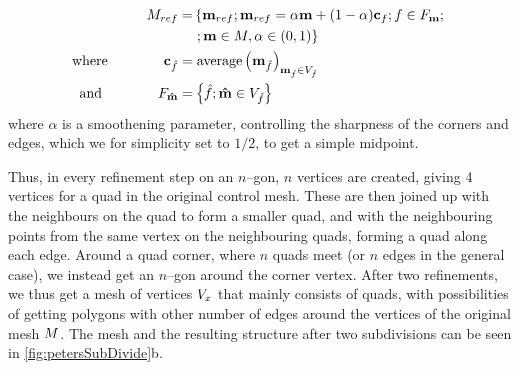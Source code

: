 \begin{align}
\petersControlMeshRef =& \left\lbrace \petersControlMeshVec_{ref} \suchthat\petersControlMeshVec_{ref} = \alpha\petersControlMeshVec + (1-\alpha)\centroidof{f} \suchthat f \in \facesof{\petersControlMeshVec} \suchthat \right.
\\ \notag &
 \left. \suchthat \petersControlMeshVec \in \petersControlMesh, \alpha \in (0,1) \right\rbrace
\\
\where \qquad\qquad \centroidof{\hat{f}} =& \; \text{average}\left(\petersControlMeshVec_{\hat{f}}\right)_{\petersControlMeshVec_{\hat{f}} \in \verticesof{\hat{f}}}
\\
\text{and} \qquad\qquad F_{\vec{\hat{m}}} =& \left\lbrace \hat{f} \suchthat \vec{\hat{m}} \in \verticesof{\hat{f}}	\right\rbrace
\end{align}
where $\alpha$ is a smoothening parameter, controlling the sharpness of the corners and edges, which we for simplicity set to $1/2$, to get a simple midpoint.

Thus, in every refinement step on an $n$--gon, $n$ vertices are created, giving 4 vertices for a quad in the original control mesh. These are then joined up with the neighbours on the quad to form a smaller quad, and with the neighbouring points from the same vertex on the neighbouring quads, forming a quad along each edge. Around a quad corner, where $n$ quads meet (or $n$ edges in the general case), we instead get an $n$--gon around the corner vertex. After two refinements, we thus get a mesh of vertices $\petersPatchPoints$ that mainly consists of quads, with possibilities of getting polygons with other number of edges around the vertices of the original mesh $\petersControlMesh$. The mesh and the resulting structure after two subdivisions can be seen in \autoref{fig:petersSubDivide}b.

